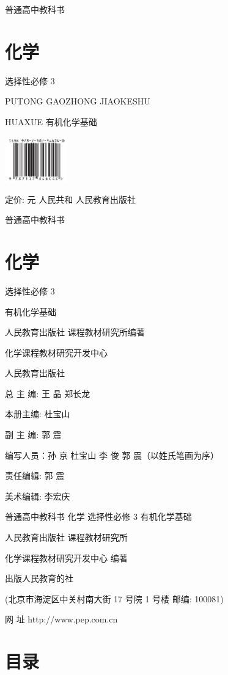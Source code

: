 \documentclass[10pt]{article}
\begin{document}
普通高中教科书

\section*{化学}

选择性必修 3

PUTONG GAOZHONG JIAOKESHU

HUAXUE 有机化学基础

\begin{center}
\includegraphics[max width=0.2\textwidth]{images/0190efc5-b58a-7c43-bfb0-e0a030df9cfd_1_243438.jpg}
\end{center}

定价: 元 人民共和 人民教育出版社

普通高中教科书

\section*{化学}

选择性必修 3

有机化学基础

人民教育出版社 课程教材研究所编著

化学课程教材研究开发中心

人民教育出版社

总 主 编: 王 晶 郑长龙

本册主编: 杜宝山

副 主 编: 郭 震

编写人员：孙 京 杜宝山 李 俊 郭 震（以姓氏笔画为序）

责任编辑: 郭 震

美术编辑: 李宏庆

普通高中教科书 化学 选择性必修 3 有机化学基础

人民教育出版社 课程教材研究所

化学课程教材研究开发中心 编著

出版人民教育的社

(北京市海淀区中关村南大街 17 号院 1 号楼 邮编: 100081)

网 址 http://www.pep.com.cn

\section*{目录}
\end{document}
